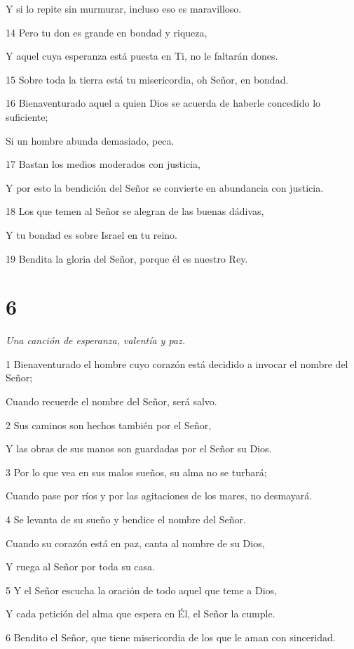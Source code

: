 \par     Y si lo repite sin murmurar, incluso eso es maravilloso.
\par 14 Pero tu don es grande en bondad y riqueza,
\par     Y aquel cuya esperanza está puesta en Ti, no le faltarán dones.
\par 15 Sobre toda la tierra está tu misericordia, oh Señor, en bondad.
\par   
\par 16 Bienaventurado aquel a quien Dios se acuerda de haberle concedido lo suficiente;
\par     Si un hombre abunda demasiado, peca.
\par 17 Bastan los medios moderados con justicia,
\par     Y por esto la bendición del Señor se convierte en abundancia con justicia.
\par 18 Los que temen al Señor se alegran de las buenas dádivas,
\par     Y tu bondad es sobre Israel en tu reino.
\par   
\par 19 Bendita la gloria del Señor, porque él es nuestro Rey.



\chapter{6}

\par \textit{Una canción de esperanza, valentía y paz.}

\par 1 Bienaventurado el hombre cuyo corazón está decidido a invocar el nombre del Señor;
\par     Cuando recuerde el nombre del Señor, será salvo.
\par 2 Sus caminos son hechos también por el Señor,
\par     Y las obras de sus manos son guardadas por el Señor su Dios.
\par 3 Por lo que vea en sus malos sueños, su alma no se turbará;
\par     Cuando pase por ríos y por las agitaciones de los mares, no desmayará.
\par 4 Se levanta de su sueño y bendice el nombre del Señor.
\par     Cuando su corazón está en paz, canta al nombre de su Dios,
\par     Y ruega al Señor por toda su casa.
\par 5 Y el Señor escucha la oración de todo aquel que teme a Dios,
\par     Y cada petición del alma que espera en Él, el Señor la cumple.
\par   
\par 6 Bendito el Señor, que tiene misericordia de los que le aman con sinceridad.


